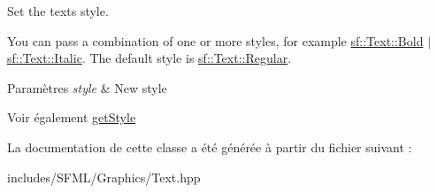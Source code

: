 Set the text\textquotesingle{}s style. 

You can pass a combination of one or more styles, for example \hyperlink{classsf_1_1Text_aa8add4aef484c6e6b20faff07452bd82af1b47f98fb1e10509ba930a596987171}{sf\+::\+Text\+::\+Bold} $\vert$ \hyperlink{classsf_1_1Text_aa8add4aef484c6e6b20faff07452bd82aee249eb803848723c542c2062ebe69d8}{sf\+::\+Text\+::\+Italic}. The default style is \hyperlink{classsf_1_1Text_aa8add4aef484c6e6b20faff07452bd82a2af9ae5e1cda126570f744448e0caa32}{sf\+::\+Text\+::\+Regular}.


\begin{DoxyParams}{Paramètres}
{\em style} & New style\\
\hline
\end{DoxyParams}
\begin{DoxySeeAlso}{Voir également}
\hyperlink{classsf_1_1Text_a0da79b0c057f4bb51592465a205c35d7}{get\+Style} 
\end{DoxySeeAlso}


La documentation de cette classe a été générée à partir du fichier suivant \+:\begin{DoxyCompactItemize}
\item 
includes/\+S\+F\+M\+L/\+Graphics/Text.\+hpp\end{DoxyCompactItemize}
